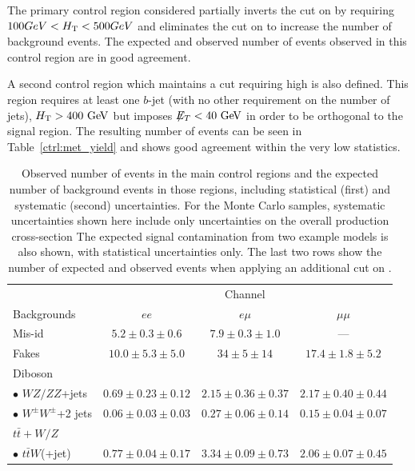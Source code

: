 The primary control region considered partially inverts the cut on \HT{} by requiring $100 GeV < H_{\mathrm{T}}{} < 500 GeV$ and eliminates the cut on \met{} to increase the number of background events.
The expected and observed number of events observed in this control region are in good agreement.

A second control region which maintains a cut requiring high \HT{} is also defined.
This region requires at least one $b$-jet (with no other requirement on the number of jets), $\HT>400 \GeV$ but imposes $\met<40 \GeV$ in order to be orthogonal to the signal region. 
The resulting number of events can be seen in Table~\ref{ctrl:met_yield} and shows good agreement within the very low statistics.


\begin{table}[p]
  \small
  \begin{center}
    \caption{Observed number of events in the main control regions and the expected number of background events in those regions, including statistical (first) and systematic (second) uncertainties.
        For the Monte Carlo samples, systematic uncertainties shown here include only uncertainties on the overall production cross-section
        The expected signal contamination from two example models is also shown, with statistical uncertainties only. 
        The last two rows show the number of expected and observed events when applying an additional cut on \met{}.}\label{ctrl:ht2j_yield}
    \begin{tabular}{l|c|c|c}
      \hline\hline
       & \multicolumn{3}{c}{Channel} \\
      \cline{2-4}
      Backgrounds & $ee$ & $e\mu$ & $\mu\mu$ \\
      \hline
      Mis-id & $5.2\pm 0.3 \pm 0.6$ & $7.9\pm 0.3 \pm 1.0$ & --- \\
      Fakes & $10.0\pm 5.3 \pm 5.0$ & $34\pm 5 \pm 14$ & $17.4\pm 1.8 \pm 5.2$ \\
      \hline
      Diboson & & & \\
      $\bullet$ $WZ/ZZ$+jets & $0.69\pm 0.23 \pm 0.12$ & $2.15\pm 0.36\pm 0.37$ & $2.17\pm 0.40\pm 0.44$ \\
      $\bullet$ $W^{\pm}W^\pm$+2 jets & $0.06\pm 0.03\pm 0.03$ & $0.27\pm 0.06\pm 0.14$ & $0.15\pm 0.04\pm 0.07$ \\
      \hline
      $t\bar{t}+W/Z$ & & & \\
      $\bullet$ $t\bar{t}W$(+jet) & $0.77\pm 0.04\pm 0.17$ & $3.34\pm 0.09\pm 0.73$ & $2.06\pm 0.07\pm 0.45$ \\

\end{tabular}
\end{center}
\end{table}
